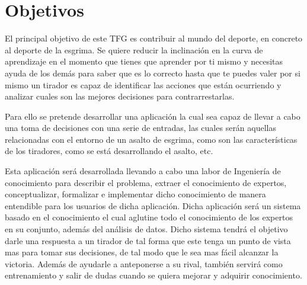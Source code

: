 \documentclass[11pt,a4paper,twoside,final]{article}
\begin{document}



\newpage

\section{Objetivos}



El principal objetivo de este TFG es contribuir al mundo del deporte, en concreto al deporte de la esgrima.
 Se quiere reducir la inclinación en la curva de aprendizaje en el momento que tienes que aprender por ti
 mismo y necesitas ayuda de los demás para saber que es lo correcto hasta que te puedes valer por si mismo
 un tirador es capaz de identificar las acciones que están ocurriendo y analizar cuales son las mejores
 decisiones para contrarrestarlas.

\medskip
Para ello se pretende desarrollar una aplicación la cual sea capaz de llevar a cabo una toma de decisiones
 con una serie de entradas, las cuales serán aquellas relacionadas con el entorno de un asalto de esgrima,
 como son las características de los tiradores, como se está desarrollando el asalto, etc.

\medskip
Esta aplicación será desarrollada llevando a cabo una labor de Ingeniería de conocimiento para describir el problema,
 extraer el conocimiento de expertos, conceptualizar, formalizar e implementar dicho conocimiento de manera entendible
 para los usuarios de dicha aplicación.
Dicha aplicación será un sistema basado en el conocimiento el cual aglutine todo el conocimiento de los expertos en
 su conjunto, además del análisis de datos. Dicho sistema tendrá el objetivo darle una respuesta a un tirador
 de tal forma que este tenga un punto de vista mas para tomar sus decisiones, de tal modo que le sea mas fácil
 alcanzar la victoria. Además de ayudarle a anteponerse a su rival, también servirá como entrenamiento y salir
 de dudas cuando se quiera mejorar y adquirir conocimiento.
\end{document}

